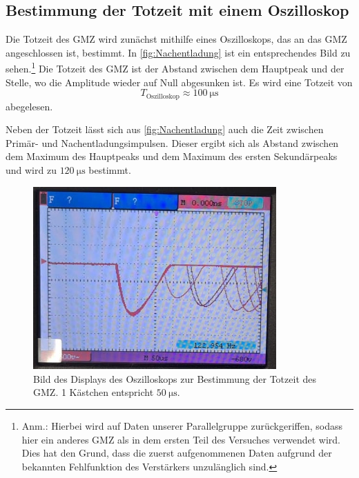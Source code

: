 \subsection{Bestimmung der Totzeit mit einem Oszilloskop}
Die Totzeit des GMZ wird zunächst mithilfe eines Oszilloskops, das an das GMZ angeschlossen ist, bestimmt. In \autoref{fig:Nachentladung} 
ist ein entsprechendes Bild zu sehen.\footnote{Anm.: Hierbei wird auf Daten unserer Parallelgruppe zurückgeriffen, sodass hier ein 
anderes GMZ als in dem ersten Teil des Versuches verwendet wird. Dies hat den Grund, dass die zuerst aufgenommenen Daten aufgrund der bekannten
Fehlfunktion des Verstärkers unzulänglich sind.} Die Totzeit des GMZ ist der Abstand zwischen dem Hauptpeak und der Stelle, wo die Amplitude wieder auf 
Null abgesunken ist. Es wird eine Totzeit von
\begin{equation*}
    T_{\text{Oszilloskop}} \approx \qty{100}{\micro\second}
\end{equation*}
abegelesen.

Neben der Totzeit lässt sich aus \autoref{fig:Nachentladung} auch die Zeit zwischen Primär- und Nachentladungsimpulsen. Dieser ergibt sich als Abstand
zwischen dem Maximum des Hauptpeaks und dem Maximum des ersten Sekundärpeaks und wird zu $\qty{120}{\micro\second}$ bestimmt.

\begin{figure}[H]
    \centering
    \includegraphics[height=7cm]{content/pics/Nachentladung.jpg}
    \caption{Bild des Displays des Oszilloskops zur Bestimmung der Totzeit des GMZ. 1 Kästchen entspricht $\qty{50}{\micro\second}$.}
    \label{fig:Nachentladung}
\end{figure}

